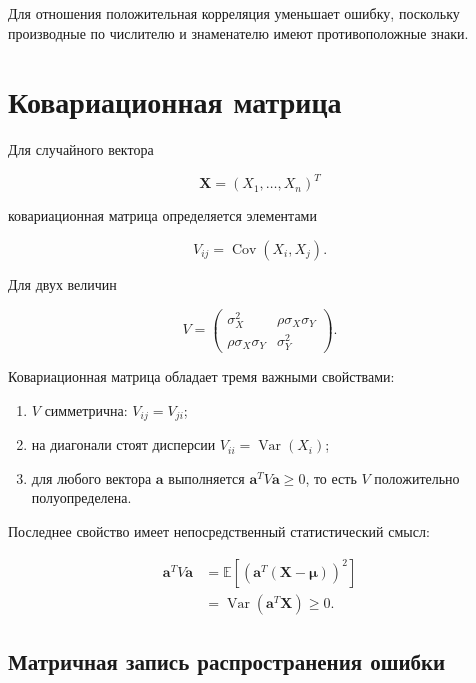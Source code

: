 \documentclass[
  russian,
  12pt,
  a4paper,
  a4paper,
  openany]{scrbook}
\providecommand{\tightlist}{%
  \setlength{\itemsep}{0pt}\setlength{\parskip}{0pt}}
\begin{document}
Для отношения положительная корреляция уменьшает ошибку, поскольку
производные по числителю и знаменателю имеют противоположные знаки.

\section{Ковариационная
матрица}\label{ux43aux43eux432ux430ux440ux438ux430ux446ux438ux43eux43dux43dux430ux44f-ux43cux430ux442ux440ux438ux446ux430}

Для случайного вектора

\[
\mathbf X=(X_1,\ldots,X_n)^T
\]

ковариационная матрица определяется элементами

\[
\boxed{
V_{ij}=\operatorname{Cov}(X_i,X_j).
}
\]

Для двух величин

\[
\boxed{
V=
\begin{pmatrix}
\sigma_X^2&\rho\sigma_X\sigma_Y\\
\rho\sigma_X\sigma_Y&\sigma_Y^2
\end{pmatrix}.
}
\]

\begin{booknote}

Ковариационная матрица обладает тремя важными свойствами:

\begin{enumerate}
\def\labelenumi{\arabic{enumi}.}
\tightlist
\item
  \(V\) симметрична: \(V_{ij}=V_{ji}\);
\item
  на диагонали стоят дисперсии \(V_{ii}=\operatorname{Var}(X_i)\);
\item
  для любого вектора \(\mathbf a\) выполняется
  \(\mathbf a^TV\mathbf a\ge0\), то есть \(V\) положительно
  полуопределена.
\end{enumerate}

\end{booknote}

Последнее свойство имеет непосредственный статистический смысл:

\[
\begin{aligned}
\mathbf a^TV\mathbf a
&=
\mathbb E\!\left[
\left(\mathbf a^T(\mathbf X-\boldsymbol\mu)\right)^2
\right]\\
&=
\operatorname{Var}(\mathbf a^T\mathbf X)
\ge0.
\end{aligned}
\]

\subsection{Матричная запись распространения
ошибки}\label{ux43cux430ux442ux440ux438ux447ux43dux430ux44f-ux437ux430ux43fux438ux441ux44c-ux440ux430ux441ux43fux440ux43eux441ux442ux440ux430ux43dux435ux43dux438ux44f-ux43eux448ux438ux431ux43aux438}
\end{document}
